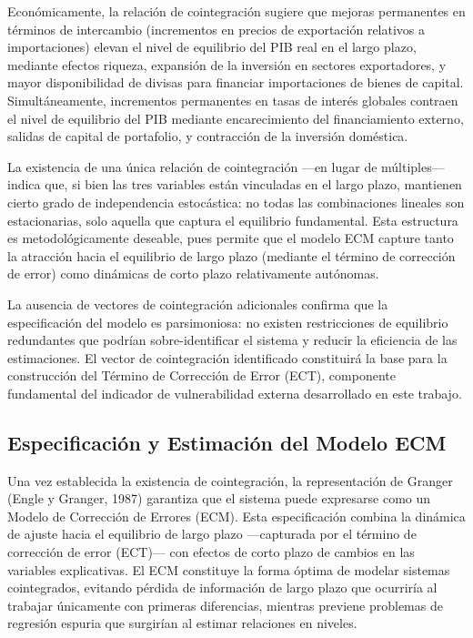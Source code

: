 \documentclass[3p,11pt]{elsarticle}
\begin{document}
Económicamente, la relación de cointegración sugiere que mejoras permanentes en términos de intercambio (incrementos en precios de exportación relativos a importaciones) elevan el nivel de equilibrio del PIB real en el largo plazo, mediante efectos riqueza, expansión de la inversión en sectores exportadores, y mayor disponibilidad de divisas para financiar importaciones de bienes de capital. Simultáneamente, incrementos permanentes en tasas de interés globales contraen el nivel de equilibrio del PIB mediante encarecimiento del financiamiento externo, salidas de capital de portafolio, y contracción de la inversión doméstica.

La existencia de una única relación de cointegración ---en lugar de múltiples--- indica que, si bien las tres variables están vinculadas en el largo plazo, mantienen cierto grado de independencia estocástica: no todas las combinaciones lineales son estacionarias, solo aquella que captura el equilibrio fundamental. Esta estructura es metodológicamente deseable, pues permite que el modelo ECM capture tanto la atracción hacia el equilibrio de largo plazo (mediante el término de corrección de error) como dinámicas de corto plazo relativamente autónomas.

La ausencia de vectores de cointegración adicionales confirma que la especificación del modelo es parsimoniosa: no existen restricciones de equilibrio redundantes que podrían sobre-identificar el sistema y reducir la eficiencia de las estimaciones. El vector de cointegración identificado constituirá la base para la construcción del Término de Corrección de Error (ECT), componente fundamental del indicador de vulnerabilidad externa desarrollado en este trabajo.

\subsection{Especificación y Estimación del Modelo ECM}

Una vez establecida la existencia de cointegración, la representación de Granger (Engle y Granger, 1987) garantiza que el sistema puede expresarse como un Modelo de Corrección de Errores (ECM). Esta especificación combina la dinámica de ajuste hacia el equilibrio de largo plazo ---capturada por el término de corrección de error (ECT)--- con efectos de corto plazo de cambios en las variables explicativas. El ECM constituye la forma óptima de modelar sistemas cointegrados, evitando pérdida de información de largo plazo que ocurriría al trabajar únicamente con primeras diferencias, mientras previene problemas de regresión espuria que surgirían al estimar relaciones en niveles.
\end{document}
